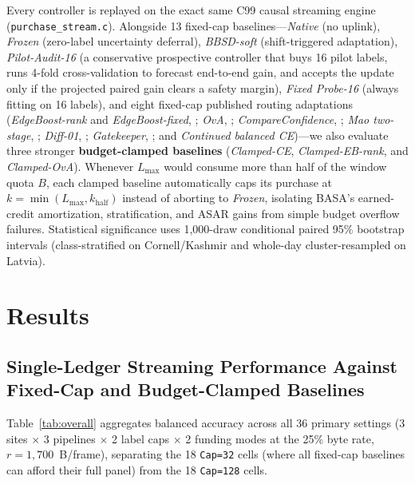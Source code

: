 \documentclass[preprint,12pt,authoryear]{elsarticle}
\begin{document}
Every controller is replayed on the exact same C99 causal streaming engine (\texttt{purchase\_\allowbreak stream.c}). Alongside 13 fixed-cap baselines---\emph{Native} (no uplink), \emph{Frozen} (zero-label uncertainty deferral), \emph{BBSD-soft} \citep{bbsd} (shift-triggered adaptation), \emph{Pilot-Audit-16} (a conservative prospective controller that buys 16 pilot labels, runs 4-fold cross-validation to forecast end-to-end gain, and accepts the update only if the projected paired gain clears a safety margin), \emph{Fixed Probe-16} (always fitting on 16 labels), and eight fixed-cap published routing adaptations (\emph{EdgeBoost-rank} and \emph{EdgeBoost-fixed}, \citealp{edgeboost}; \emph{OvA}, \citealp{ova}; \emph{CompareConfidence}, \citealp{compareconf}; \emph{Mao two-stage}, \citealp{mao2025}; \emph{Diff-01}, \citealp{jitkrittum2023}; \emph{Gatekeeper}, \citealp{gatekeeper}; and \emph{Continued balanced CE})---we also evaluate three stronger \textbf{budget-clamped baselines} (\emph{Clamped-CE}, \emph{Clamped-EB-rank}, and \emph{Clamped-OvA}). Whenever $L_{\max}$ would consume more than half of the window quota $B$, each clamped baseline automatically caps its purchase at $k = \min(L_{\max}, k_{\mathrm{half}})$ instead of aborting to \emph{Frozen}, isolating BASA's earned-credit amortization, stratification, and ASAR gains from simple budget overflow failures. Statistical significance uses 1,000-draw conditional paired 95\% bootstrap intervals (class-stratified on Cornell/Kashmir and whole-day cluster-resampled on Latvia).

\section{Results}
\label{sec:results}

\subsection{Single-Ledger Streaming Performance Against Fixed-Cap and Budget-Clamped Baselines}
\label{sec:main_res}

Table~\ref{tab:overall} aggregates balanced accuracy across all 36 primary settings (3 sites $\times$ 3 pipelines $\times$ 2 label caps $\times$ 2 funding modes at the 25\% byte rate, $r = 1{,}700$~B/frame), separating the 18 \texttt{Cap=32} cells (where all fixed-cap baselines can afford their full panel) from the 18 \texttt{Cap=128} cells.
\end{document}
